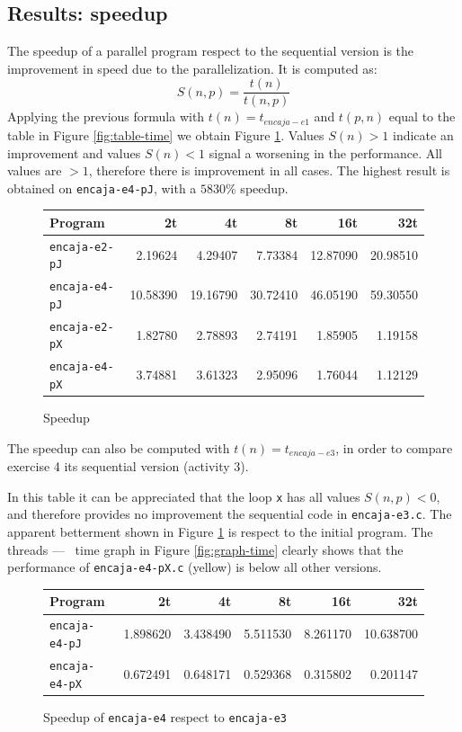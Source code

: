 \documentclass[a4paper]{article}
\begin{document}
\subsection{Results: speedup}
The speedup of a parallel program respect to the sequential version is the improvement in speed due to the parallelization. It is computed as:
\begin{equation}
S(n,p)=\frac{t(n)}{t(n,p)}
\end{equation}
Applying the previous formula with $t(n)=t_{encaja-e1}$ and $t(p,n)$ equal to the table in Figure \ref{fig:table-time} we obtain Figure \ref{fig:table-speedup}. Values $S(n) > 1$ indicate an improvement and values $S(n) < 1$ signal a worsening in the performance. All values are $>1$, therefore there is improvement in all cases. The highest result is obtained on \texttt{encaja-e4-pJ}, with a $5830\%$ speedup.
\begin{figure}[h]
    \centering
    \begin{tabular}{l r r r r r}
        Program               & 2t       & 4t       & 8t       & 16t      & 32t      \\ \hline
        \texttt{encaja-e2-pJ} &  2.19624 &  4.29407 &  7.73384 & 12.87090 & 20.98510 \\
        \texttt{encaja-e4-pJ} & 10.58390 & 19.16790 & 30.72410 & 46.05190 & 59.30550 \\
        \texttt{encaja-e2-pX} &  1.82780 &  2.78893 &  2.74191 &  1.85905 &  1.19158 \\
        \texttt{encaja-e4-pX} &  3.74881 &  3.61323 &  2.95096 &  1.76044 &  1.12129 \\ \hline
    \end{tabular}
    \caption{Speedup}
    \label{fig:table-speedup}
\end{figure}

The speedup can also be computed with $t(n)=t_{encaja-e3}$, in order to compare exercise 4 its sequential version (activity 3). 

In this table it can be appreciated that the loop \texttt{x} has all values $S(n,p)<0$, and therefore provides no improvement the sequential code in \texttt{encaja-e3.c}. The apparent betterment shown in Figure \ref{fig:table-speedup} is respect to the initial program. The threads --- \unskip \, time graph in Figure \ref{fig:graph-time} clearly shows that the performance of \texttt{encaja-e4-pX.c} (yellow) is below all other versions.

\begin{figure}[h]
    \centering
    \begin{tabular}{l r r r r r}
        Program               & 2t       & 4t       & 8t       & 16t      & 32t       \\ \hline
        \texttt{encaja-e4-pJ} & 1.898620 & 3.438490 & 5.511530 & 8.261170 & 10.638700 \\
        \texttt{encaja-e4-pX} & 0.672491 & 0.648171 & 0.529368 & 0.315802 &  0.201147 \\ \hline
    \end{tabular}
    \caption{Speedup of \texttt{encaja-e4} respect to \texttt{encaja-e3}}
    \label{fig:table-speedupR3}
\end{figure}
\end{document}
